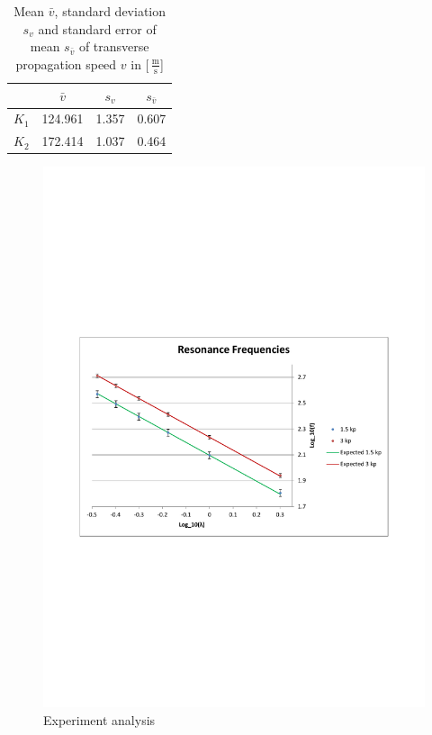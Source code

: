 \documentclass{scrreprt}
\newcommand{\unit}[1]{\ensuremath{\, \mathrm{#1}}}
\begin{document}
\begin{table}[H]
\center
\begin{tabular}{|c|ccc|}
\cline{2-4}
\multicolumn{1}{c|}{}& $\bar{v}$ & $s_{v}$ & $s_{\bar{v}}$\\ \hline
$K_1$ & 124.961 & 1.357 & 0.607 \\ \hline
$K_2$ & 172.414 & 1.037 & 0.464\\ \hline
\end{tabular}
\caption{Mean $\bar{v}$, standard deviation $s_{v}$ and standard error of mean $s_{\bar{v}}$ of transverse propagation speed $v$ in [$\unit{\frac{m}{s}}$]}
\end{table}

\begin{figure}[H]
\center
\includegraphics[width=1.0\textwidth]{img/ResonanceFrequencies.pdf}
\caption{Experiment analysis}
\end{figure}
\end{document}
